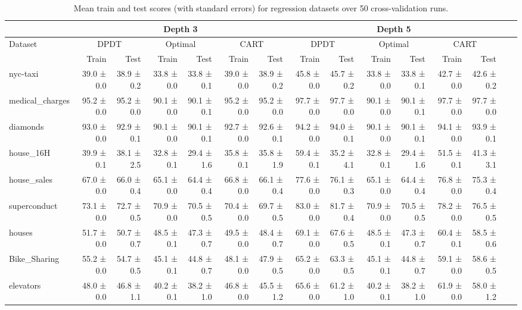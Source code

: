 \begin{table}
\tiny
\centering
\caption{Mean train and test scores (with standard errors) for regression datasets over 50 cross-validation runs.}\label{tab:regression}
\begin{tabular}{l|rr|rr|rr||rr|rr|rr|rr}
\hline
 & \multicolumn{6}{c||}{\textbf{Depth 3}} & \multicolumn{6}{c|}{\textbf{Depth 5}} \\ \hline
Dataset & \multicolumn{2}{c|}{DPDT} & \multicolumn{2}{c|}{Optimal} & \multicolumn{2}{c||}{CART} & \multicolumn{2}{c|}{DPDT} & \multicolumn{2}{c|}{Optimal} & \multicolumn{2}{c|}{CART} \\
 & Train & Test & Train & Test & Train & Test & Train & Test & Train & Test & Train & Test \\
\hline
nyc-taxi & 39.0 ± 0.0 & 38.9 ± 0.2 & 33.8 ± 0.0 & 33.8 ± 0.1 & 39.0 ± 0.0 & 38.9 ± 0.2 & 45.8 ± 0.0 & 45.7 ± 0.2 & 33.8 ± 0.0 & 33.8 ± 0.1 & 42.7 ± 0.0 & 42.6 ± 0.2 \\
medical\_charges & 95.2 ± 0.0 & 95.2 ± 0.0 & 90.1 ± 0.0 & 90.1 ± 0.1 & 95.2 ± 0.0 & 95.2 ± 0.0 & 97.7 ± 0.0 & 97.7 ± 0.0 & 90.1 ± 0.0 & 90.1 ± 0.1 & 97.7 ± 0.0 & 97.7 ± 0.0 \\
diamonds & 93.0 ± 0.0 & 92.9 ± 0.1 & 90.1 ± 0.0 & 90.1 ± 0.1 & 92.7 ± 0.0 & 92.6 ± 0.1 & 94.2 ± 0.0 & 94.0 ± 0.1 & 90.1 ± 0.0 & 90.1 ± 0.1 & 94.1 ± 0.0 & 93.9 ± 0.1 \\
house\_16H & 39.9 ± 0.1 & 38.1 ± 2.5 & 32.8 ± 0.1 & 29.4 ± 1.6 & 35.8 ± 0.1 & 35.8 ± 1.9 & 59.4 ± 0.1 & 35.2 ± 4.1 & 32.8 ± 0.1 & 29.4 ± 1.6 & 51.5 ± 0.1 & 41.3 ± 3.1 \\
house\_sales & 67.0 ± 0.0 & 66.0 ± 0.4 & 65.1 ± 0.0 & 64.4 ± 0.4 & 66.8 ± 0.0 & 66.1 ± 0.4 & 77.6 ± 0.0 & 76.1 ± 0.3 & 65.1 ± 0.0 & 64.4 ± 0.4 & 76.8 ± 0.0 & 75.3 ± 0.4 \\
superconduct & 73.1 ± 0.0 & 72.7 ± 0.5 & 70.9 ± 0.0 & 70.5 ± 0.5 & 70.4 ± 0.0 & 69.7 ± 0.5 & 83.0 ± 0.0 & 81.7 ± 0.4 & 70.9 ± 0.0 & 70.5 ± 0.5 & 78.2 ± 0.0 & 76.5 ± 0.5 \\
houses & 51.7 ± 0.0 & 50.7 ± 0.7 & 48.5 ± 0.1 & 47.3 ± 0.7 & 49.5 ± 0.0 & 48.4 ± 0.7 & 69.1 ± 0.0 & 67.6 ± 0.5 & 48.5 ± 0.1 & 47.3 ± 0.7 & 60.4 ± 0.1 & 58.5 ± 0.6 \\
Bike\_Sharing & 55.2 ± 0.0 & 54.7 ± 0.5 & 45.1 ± 0.1 & 44.8 ± 0.7 & 48.1 ± 0.0 & 47.9 ± 0.5 & 65.2 ± 0.0 & 63.3 ± 0.5 & 45.1 ± 0.1 & 44.8 ± 0.7 & 59.1 ± 0.0 & 58.6 ± 0.5 \\
elevators & 48.0 ± 0.0 & 46.8 ± 1.1 & 40.2 ± 0.1 & 38.2 ± 1.0 & 46.8 ± 0.0 & 45.5 ± 1.2 & 65.6 ± 0.0 & 61.2 ± 1.0 & 40.2 ± 0.1 & 38.2 ± 1.0 & 61.9 ± 0.0 & 58.0 ± 1.2 \\

\end{tabular}
\end{table}
